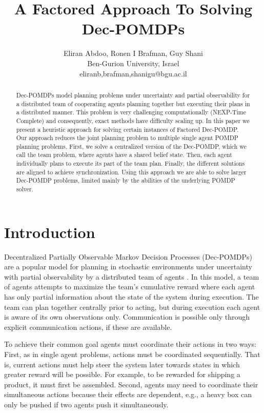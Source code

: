 \documentclass[letterpaper]{article} %
\title{A Factored Approach To Solving Dec-POMDPs }
\author{Eliran Abdoo, Ronen I Brafman, Guy Shani\\
Ben-Gurion University, Israel\\
eliranb,brafman,shanigu@bgu.ac.il}
\theoremstyle{definition}
\begin{document}
\maketitle

\begin{abstract}
Dec-POMDPs model planning problems under uncertainty and partial observability for a distributed team of cooperating agents planning together but executing their plans in a distributed manner. This problem is
very challenging computationally (NEXP-Time Complete) and consequently, exact methods have difficulty scaling up. In this paper we present a heuristic approach for solving certain instances of Factored Dec-POMDP. Our approach reduces the joint planning problem to multiple single agent POMDP planning problems.
First, we solve a centralized version of the Dec-POMDP, which we call the team problem, where agents have a shared belief state. Then, each agent individually plans to execute its part of the team plan. Finally, the different solutions are aligned to achieve synchronization. Using this approach we are able to solve larger Dec-POMDP problems, limited mainly by the abilities of the underlying POMDP solver.
\end{abstract}




\section{Introduction}

Decentralized Partially Observable Markov Decision Processes (Dec-POMDPs) are a popular model for planning in stochastic environments under uncertainty with partial observability by a distributed team of agents \cite{DECPOMDPART}. In this model, a team of agents attempts to maximize the team's cumulative reward where each agent has only partial information about the state of the system during execution.  The team can plan together centrally prior to acting, but during execution each agent is aware of its own observations only. Communication is possible only through explicit communication actions, if these are available. 

To achieve their common goal agents must coordinate their actions in two ways: First, as in single agent problems, actions must be coordinated sequentially. That is, current actions must help steer the system later towards states in which greater reward will be possible. For example, to be rewarded for shipping a product, it must first be assembled. 
Second, agents may need to coordinate their simultaneous actions because their effects are dependent, e.g., a heavy box can only be pushed if two agents push it simultaneously. 
\end{document}
